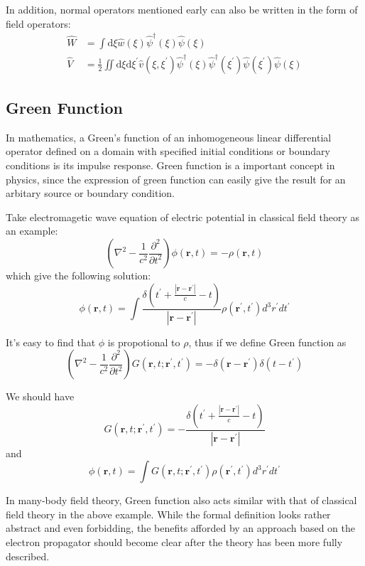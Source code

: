\documentclass[bachelor, english]{ustcthesis}
\begin{document}
In addition, normal operators mentioned early can also be written in the form of field operators:
$$
\begin{aligned} \hat{W} &=\int \mathrm{d} \xi \hat{w}(\xi) \hat{\psi}^{\dagger}(\xi) \hat{\psi}(\xi) \\ \hat{V} &=\frac{1}{2} \iint \mathrm{d} \xi \mathrm{d} \xi^{\prime} \hat{v}\left(\xi, \xi^{\prime}\right) \hat{\psi}^{\dagger}(\xi) \hat{\psi}^{\dagger}\left(\xi^{\prime}\right) \hat{\psi}\left(\xi^{\prime}\right) \hat{\psi}(\xi) \end{aligned}
$$

\subsection{Green Function} \label{mathrefs}

In mathematics, a Green's function of an inhomogeneous linear differential operator defined on a domain with specified initial conditions or boundary conditions is its impulse response.
Green function is a important concept in physics, since the expression of green function can easily give the result for an arbitary source or boundary condition.

Take electromagetic wave equation of electric potential in classical field theory as an example:
$$
\left(\nabla^{2}-\frac{1}{c^2}\frac{\partial^{2}}{\partial t^{2}}\right) \phi(\mathbf{r},t)=-\rho(\mathbf{r},t)
$$
which give the following solution:
$$
\phi(\mathbf{r}, t)=\int \frac{\delta\left(t^{\prime}+\frac{\left|\mathbf{r}-\mathbf{r}^{\prime}\right|}{c}-t\right)}{\left|\mathbf{r}-\mathbf{r}^{\prime}\right|} \rho\left(\mathbf{r}^{\prime}, t^{\prime}\right) d^{3} r^{\prime} d t^{\prime}
$$

It's easy to find that $\phi$ is propotional to $\rho$, thus if we define Green function as
$$
\left(\nabla^{2}-\frac{1}{c^2}\frac{\partial^{2}}{\partial t^{2}}\right) G(\mathbf{r},t;\mathbf{r^{\prime}},t^{\prime})=-\delta(\mathbf{r}-\mathbf{r^\prime})\delta(t-t^{\prime})
$$

We should have
$$
G(\mathbf{r},t;\mathbf{r^{\prime}},t^{\prime})=
-\frac{\delta\left(t^{\prime}+\frac{\left|\mathbf{r}-\mathbf{r}^{\prime}\right|}{c}-t\right)}{\left|\mathbf{r}-\mathbf{r}^{\prime}\right|}
$$
and
$$
\phi(\mathbf{r}, t)=
\int G(\mathbf{r},t;\mathbf{r^{\prime}},t^{\prime}) \rho\left(\mathbf{r}^{\prime}, t^{\prime}\right) d^{3} r^{\prime} d t^{\prime}
$$

In many-body field theory, Green function also acts similar with that of classical field theory in the above example.
While the formal definition looks rather abstract and even forbidding, the benefits afforded by an approach based on the electron propagator should become clear after the theory has been more fully described.
\end{document}
